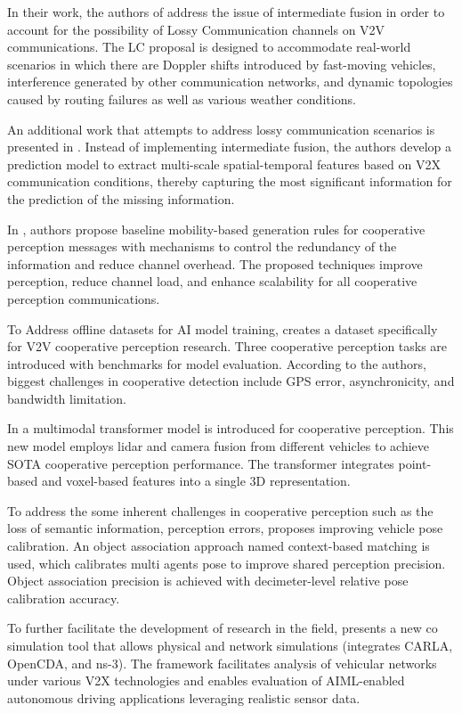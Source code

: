 In their work, the authors of \cite{Li_2023} address the issue of intermediate fusion in order to account for the possibility of Lossy Communication channels on V2V communications. The LC proposal is designed to accommodate real-world scenarios in which there are Doppler shifts introduced by fast-moving vehicles, interference generated by other communication networks, and dynamic topologies caused by routing failures as well as various weather conditions. 

An additional work that attempts to address lossy communication scenarios is presented in \cite{ren2024interruptionaware}. Instead of implementing intermediate fusion, the authors develop a prediction model to extract multi-scale spatial-temporal features based on V2X communication conditions, thereby capturing the most significant information for the prediction of the missing information.

In \cite{THANDAVARAYAN2023103655}, authors propose baseline mobility-based generation rules for cooperative perception messages with mechanisms to control the redundancy of the information and reduce channel overhead. The proposed techniques improve perception, reduce channel load, and enhance scalability for all cooperative perception communications.

To Address offline datasets for AI model training, \cite{xu2023v2v4real} creates a dataset specifically for V2V cooperative perception research. Three cooperative perception tasks are introduced with benchmarks for model evaluation. According to the authors, biggest challenges in cooperative detection include GPS error, asynchronicity, and bandwidth limitation.

In \cite{v2vformer} a multimodal transformer model is introduced for cooperative perception. This new model employs lidar and camera fusion from different vehicles to achieve SOTA cooperative perception performance. The transformer integrates point-based and voxel-based features into a single 3D representation.

To address the some inherent challenges in cooperative perception such as the loss of semantic information, perception errors, \cite{song2024spatial} proposes improving vehicle pose calibration. An object association approach named context-based matching is used, which calibrates multi agents pose to improve shared perception precision. Object association precision is achieved with decimeter-level relative pose calibration accuracy.

To further facilitate the development of research in the field, \cite{carletti2024ms} presents a new co simulation tool that allows physical and network simulations (integrates CARLA, OpenCDA, and ns-3). The framework facilitates analysis of  vehicular networks under various V2X technologies and enables evaluation of AIML-enabled autonomous driving applications leveraging realistic sensor data.

